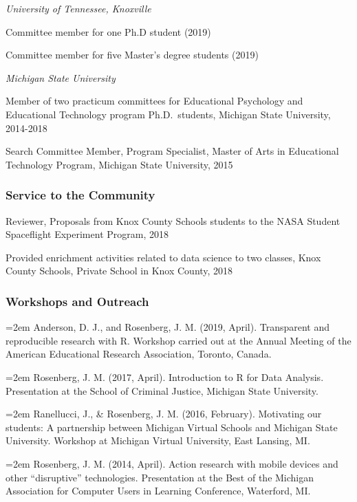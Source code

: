 \documentclass[14,]{article}
\begin{document}
\emph{University of Tennessee, Knoxville}

Committee member for one Ph.D student (2019)

Committee member for five Master's degree students (2019)

\emph{Michigan State University}

Member of two practicum committees for Educational Psychology and
Educational Technology program Ph.D.~students, Michigan State
University, 2014-2018

Search Committee Member, Program Specialist, Master of Arts in
Educational Technology Program, Michigan State University, 2015

\hypertarget{service-to-the-community-1}{%
\subsubsection{Service to the
Community}\label{service-to-the-community-1}}

Reviewer, Proposals from Knox County Schools students to the NASA
Student Spaceflight Experiment Program, 2018

Provided enrichment activities related to data science to two classes,
Knox County Schools, Private School in Knox County, 2018

\hypertarget{workshops-and-outreach}{%
\subsubsection{Workshops and Outreach}\label{workshops-and-outreach}}

\hangindent=2em Anderson, D. J., and Rosenberg, J. M. (2019, April).
Transparent and reproducible research with R. Workshop carried out at
the Annual Meeting of the American Educational Research Association,
Toronto, Canada.

\hangindent=2em Rosenberg, J. M. (2017, April). Introduction to R for
Data Analysis. Presentation at the School of Criminal Justice, Michigan
State University.

\hangindent=2em Ranellucci, J., \& Rosenberg, J. M. (2016, February).
Motivating our students: A partnership between Michigan Virtual Schools
and Michigan State University. Workshop at Michigan Virtual University,
East Lansing, MI.

\hangindent=2em Rosenberg, J. M. (2014, April). Action research with
mobile devices and other ``disruptive'' technologies. Presentation at
the Best of the Michigan Association for Computer Users in Learning
Conference, Waterford, MI.
\end{document}
